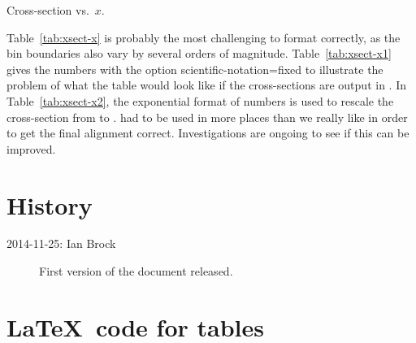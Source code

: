 \documentclass[UKenglish]{../../latex/atlasdoc}
\begin{document}
\begin{table}[htb]
  \centering
  \renewcommand{\arraystretch}{1.4}
  \subfloat[No special formatting or rounding. Option
  \textsf{scientific-notation=fixed} used.]{%
    \label{tab:xsect-x1}%
    }
  \qquad
  \caption{Cross-section vs.\ $x$.}
  \label{tab:xsect-x}
\end{table}

Table~\ref{tab:xsect-x} is probably the most challenging to format
correctly, as the bin boundaries also vary by several orders of
magnitude. Table~\ref{tab:xsect-x1} gives the numbers with the option
\textsf{scientific-notation=fixed} to illustrate the problem of what
the table would look like if the cross-sections are output in
\si{\pb}.  In Table~\ref{tab:xsect-x2}, the exponential format of
numbers is used to rescale the cross-section from \si{\pb} to
\si{\nb}.   had to be used in more places than we
really like in order to get the final alignment
correct. Investigations are ongoing to see if this can be improved.

\section*{History}

\begin{description}
\item[2014-11-25: Ian Brock] First version of the document released.
\end{description}

\printbibliography
% 
% 

\appendix
\section{\LaTeX\ code for tables}
\label{sec:raw-data}
\end{document}
